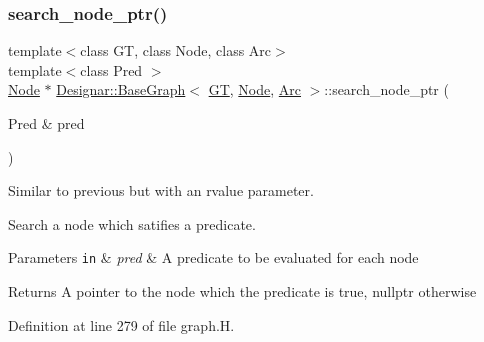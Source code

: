 \subsubsection{\texorpdfstring{search\+\_\+node\+\_\+ptr()}{search\_node\_ptr()}\hspace{0.1cm}{\footnotesize\ttfamily [1/2]}}
{\footnotesize\ttfamily template$<$class GT, class Node, class Arc$>$ \\
template$<$class Pred $>$ \\
\hyperlink{namespace_designar_a5af326c65aa2bd26b26c410f2030d09e}{Node} $\ast$ \hyperlink{class_designar_1_1_base_graph}{Designar\+::\+Base\+Graph}$<$ \hyperlink{demo-buildgraph_8_c_a3001c40d2c31ca87ed96cd7d1334a55e}{GT}, \hyperlink{namespace_designar_a5af326c65aa2bd26b26c410f2030d09e}{Node}, \hyperlink{namespace_designar_a3f55fb5513d62ff47cbc8f72b8e95d6f}{Arc} $>$\+::search\+\_\+node\+\_\+ptr (\begin{DoxyParamCaption}\item[{Pred \&}]{pred }\end{DoxyParamCaption})\hspace{0.3cm}{\ttfamily [inline]}}



Similar to previous but with an rvalue parameter. 

Search a node which satifies a predicate.


\begin{DoxyParams}[1]{Parameters}
\mbox{\tt in}  & {\em pred} & A predicate to be evaluated for each node \\
\hline
\end{DoxyParams}
\begin{DoxyReturn}{Returns}
A pointer to the node which the predicate is true, {\ttfamily nullptr} otherwise 
\end{DoxyReturn}


Definition at line 279 of file graph.\+H.

\mbox{\label{class_designar_1_1_base_graph_a1f19e5a79bfa156fd4cd80f3d8e27aa4}} 
